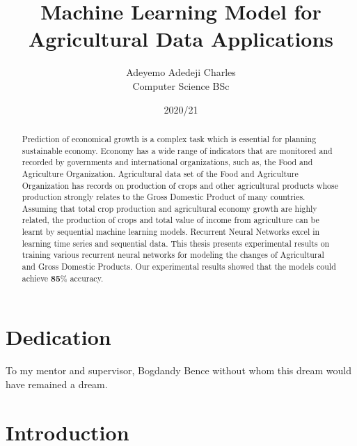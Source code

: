 \documentclass[
]{thesis-ekf}
\begin{document}
	
	
\title{Machine Learning Model for Agricultural Data Applications}
\author{Adeyemo Adedeji Charles\\Computer Science BSc}
	
\date{2020/21}
\maketitle



\begin{abstract}
	Prediction of economical growth is a complex task which is essential for planning sustainable economy.
	Economy has a wide range of indicators that are monitored and recorded by governments and international organizations, such as, the Food and Agriculture Organization.
	Agricultural data set of the Food and Agriculture Organization has records on production of crops and other agricultural products whose production strongly relates to the Gross Domestic Product of many countries.
	Assuming that total crop production and agricultural economy growth are highly related, the production of crops and total value of income from agriculture can be learnt by sequential machine learning models.
	Recurrent Neural Networks excel in learning time series and sequential data. 
	This thesis presents experimental results on training various recurrent neural networks for modeling the changes of Agricultural and Gross Domestic Products.  
	Our experimental results showed that the models could achieve \textbf{85}\% accuracy. 	
\end{abstract}

\chapter*{Dedication}

To my mentor and supervisor, Bogdandy Bence without whom this dream would have remained a dream. 

\tableofcontents

\chapter*{Introduction}

\end{document}
